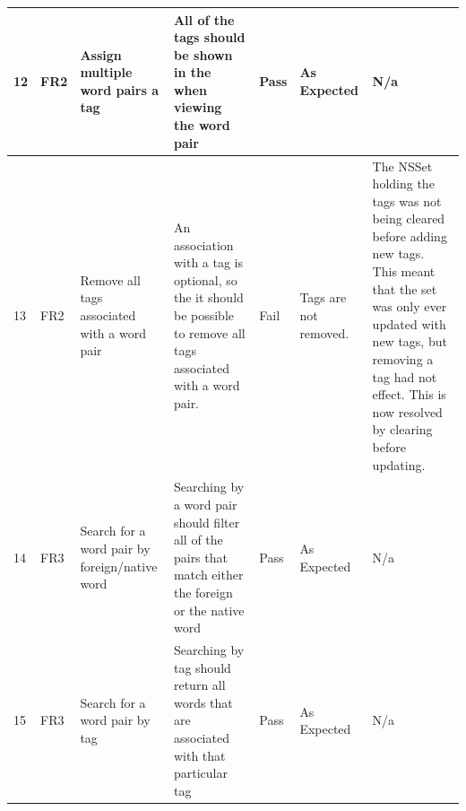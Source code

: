 \documentclass[paper=a4, fontsize=11pt]{scrartcl}	%
\numberwithin{equation}{section}															%
\numberwithin{figure}{section}																%
\numberwithin{table}{section}
\begin{document}
\begin{landscape}
\begin{longtable}{|l|p{2cm}|p{5cm}|p{5cm}|l|p{5cm}|p{5cm}|}
12 & FR2                    & Assign multiple word pairs a tag                     & All of the tags should be shown in the when viewing the word pair                                                                                                                                                                          & Pass      & As Expected                                        & N/a                                                                                                                                                                                                                        \\ \hline
13 & FR2                    & Remove all tags associated with a word pair          & An association with a tag is optional, so the it should be possible to remove all tags associated with a word pair.                                                                                                                        & Fail      & Tags are not removed.                              & The NSSet holding the tags was not being cleared before adding new tags. This meant that the set was only ever updated with new tags, but removing a tag had not effect. This is now resolved by clearing before updating. \\ \hline
14 & FR3                    & Search for a word pair by foreign/native word        & Searching by a word pair should filter all of the pairs that match either the foreign or the native word                                                                                                                                   & Pass      & As Expected                                        & N/a                                                                                                                                                                                                                        \\ \hline
15 & FR3                    & Search for a word pair by tag                        & Searching by tag should return all words that are associated with that particular tag                                                                                                                                                      & Pass      & As Expected                                        & N/a                                                                                                                                                                                                                        \\ \hline

\end{longtable}
\end{landscape}
\end{document}
